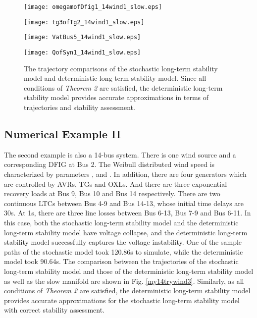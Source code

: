 \documentclass[journal]{IEEEtran}
\begin{document}
\begin{figure}[!ht]
\centering
\begin{minipage}[t]{0.5\linewidth}
\texttt{[image: omegamofDfig1\_14wind1\_slow.eps]}
\end{minipage}\begin{minipage}[t]{0.5\linewidth}
\texttt{[image: tg3ofTg2\_14wind1\_slow.eps]}
\end{minipage}
\begin{minipage}[t]{0.5\linewidth}
\texttt{[image: VatBus5\_14wind1\_slow.eps]}
\end{minipage}\begin{minipage}[t]{0.5\linewidth}
\texttt{[image: QofSyn1\_14wind1\_slow.eps]}
\end{minipage}
\caption{The trajectory comparisons of the stochastic long-term stability model and deterministic long-term stability model. Since all conditions of \textit{Theorem 2} are satisfied, the deterministic long-term stability model provides accurate approximations in terms of trajectories and stability assessment.}\label{my14wind1}
\end{figure}


\subsection{Numerical Example II}
The second example is also a 14-bus system. There is one wind source and a corresponding DFIG at Bus 2. The Weibull distributed wind speed is characterized by parameters ,  and . In addition, there are four generators which are controlled by AVRs, TGs and OXLs. And there are three exponential recovery loads at Bus 9, Bus 10 and Bus 14 respectively. There are two continuous LTCs between Bus 4-9 and Bus 14-13, whose initial time delays are 30s. At 1s, there are three line losses between Bus 6-13, Bus 7-9 and Bus 6-11. 
In this case, both the stochastic long-term stability model and the deterministic long-term stability model have voltage collapse, and the deterministic long-term stability model successfully captures the voltage instability. One of the sample paths of the stochastic model took 120.86s to simulate, while the deterministic model took 90.64s. The comparison between the trajectories of the stochastic long-term stability model and those of the deterministic long-term stability model as well as the slow manifold are shown in Fig. \ref{my14trywind3}. Similarly, as all conditions of \textit{Theorem 2} are satisfied, the deterministic long-term stability model provides accurate approximations for the stochastic long-term stability model with correct stability assessment.
\end{document}
